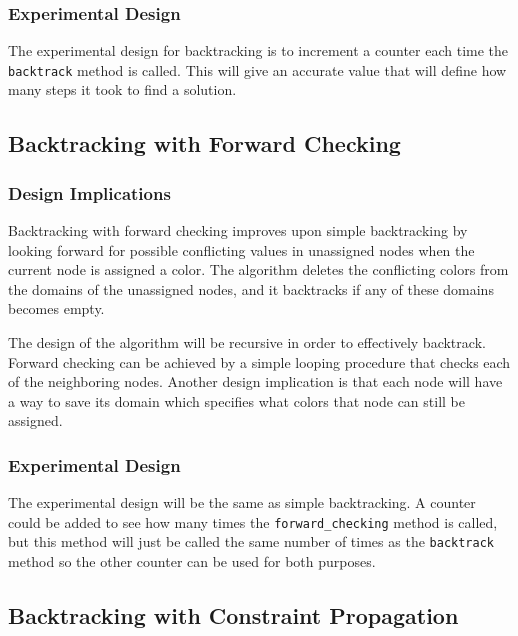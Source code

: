 \documentclass{article}
\begin{document}
\begin{multicols}{2}
\subsubsection{Experimental Design}
The experimental design for backtracking is to increment a counter each time the \texttt{backtrack} method is called. This will give an accurate value that will define how many steps it took to find a solution. 

\subsection{Backtracking with Forward Checking}
\subsubsection{Design Implications}
Backtracking with forward checking improves upon simple backtracking by looking forward for possible conflicting values in unassigned nodes when the current node is assigned a color.  The algorithm deletes the conflicting colors from the domains of the unassigned nodes, and it backtracks if any of these domains becomes empty. \par
The design of the algorithm will be recursive in order to effectively backtrack.  Forward checking can be achieved by a simple looping procedure that checks each of the neighboring nodes. Another design implication is that each node will have a way to save its domain which specifies what colors that node can still be assigned.\par
\subsubsection{Experimental Design}
The experimental design will be the same as simple backtracking. A counter could be added to see how many times the \texttt{forward\_checking}  method is called, but this method will just be called the same number of times as the \texttt{backtrack} method so the other counter can be used for both purposes.

\subsection{Backtracking with Constraint Propagation}

\end{multicols}
\end{document}

